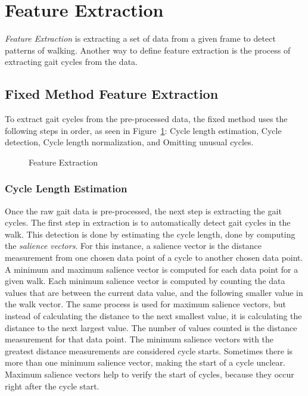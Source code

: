 \documentclass{sig-alternate}
\begin{document}
\section{Feature Extraction}
	\textit{Feature Extraction} is extracting a set of data from a given frame to detect patterns of walking. Another way to define feature extraction is the process of extracting gait cycles from the data. 		
\subsection{Fixed Method Feature Extraction}
	To extract gait cycles from the pre-processed data, the fixed method uses the following steps in order, as seen in Figure~\ref{fig:SecondStep}: Cycle length estimation, Cycle detection, Cycle length normalization, and Omitting unusual cycles. 
	
\begin{figure}
\centering
{}
\caption{Feature Extraction}
\label{fig:SecondStep}
\end{figure}

			
\subsubsection{Cycle Length Estimation}
	Once the raw gait data is pre-processed, the next step is extracting the gait cycles. The first step in extraction is to automatically detect gait cycles in the walk. This detection is done by estimating the cycle length, done by computing the \textit{salience vectors}. For this instance, a salience vector is the distance measurement from one chosen data point of a cycle to another chosen data point. A minimum and maximum salience vector is computed for each data point for a given walk. Each minimum salience vector is computed by counting the data values that are between the current data value, and the following smaller value in the walk vector. The same process is used for maximum salience vectors, but instead of calculating the distance to the next smallest value, it is calculating the distance to the next largest value. The number of values counted is the distance measurement for that data point. The minimum salience vectors with the greatest distance measurements are considered cycle starts. Sometimes there is more than one minimum salience vector, making the start of a cycle unclear. Maximum salience vectors help to verify the start of cycles, because they occur right after the cycle start.
			
\end{document}
